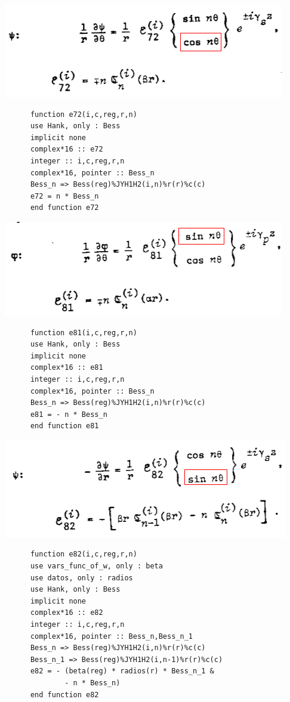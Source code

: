 \documentclass [11pt,spanish]{article}
\begin{document}
\endgroup
\includegraphics[scale=0.5]{e72}
\begingroup
\fontsize{10pt}{12pt}
\selectfont
{}
\begin{shaded}
\begin{verbatim}
      function e72(i,c,reg,r,n)
      use Hank, only : Bess
      implicit none
      complex*16 :: e72
      integer :: i,c,reg,r,n
      complex*16, pointer :: Bess_n
      Bess_n => Bess(reg)%JYH1H2(i,n)%r(r)%c(c)
      e72 = n * Bess_n
      end function e72
\end{verbatim}
\end{shaded}
\endgroup
\includegraphics[scale=0.5]{e81}
\begingroup
\fontsize{10pt}{12pt}
\selectfont
{}
\begin{shaded}
\begin{verbatim}
      function e81(i,c,reg,r,n)
      use Hank, only : Bess
      implicit none
      complex*16 :: e81
      integer :: i,c,reg,r,n
      complex*16, pointer :: Bess_n
      Bess_n => Bess(reg)%JYH1H2(i,n)%r(r)%c(c)
      e81 = - n * Bess_n
      end function e81
\end{verbatim}
\end{shaded}
\endgroup
\includegraphics[scale=0.5]{e82}
\begingroup
\fontsize{10pt}{12pt}
\selectfont
{}
\begin{shaded}
\begin{verbatim}
      function e82(i,c,reg,r,n)
      use vars_func_of_w, only : beta
      use datos, only : radios
      use Hank, only : Bess
      implicit none
      complex*16 :: e82
      integer :: i,c,reg,r,n
      complex*16, pointer :: Bess_n,Bess_n_1
      Bess_n => Bess(reg)%JYH1H2(i,n)%r(r)%c(c)
      Bess_n_1 => Bess(reg)%JYH1H2(i,n-1)%r(r)%c(c)
      e82 = - (beta(reg) * radios(r) * Bess_n_1 & 
              - n * Bess_n)
      end function e82
\end{verbatim}
\end{shaded}
\endgroup
\end{document}
